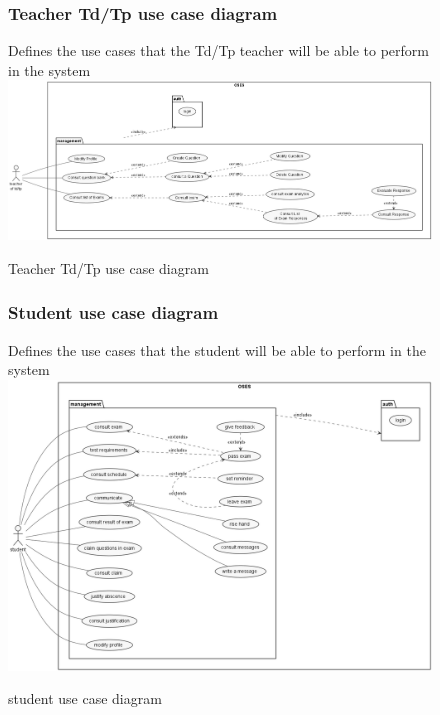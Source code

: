 \documentclass[]{uc2pfecaneva}
\begin{document}
    \begin{figure}
        \subsubsection{Teacher Td/Tp use case diagram}
        \raggedright{Defines the use cases that the Td/Tp teacher will be able to perform in the system}
        \includegraphics[width=\textwidth]{images/TP_TD_Teacher}
        \caption{Teacher Td/Tp use case diagram}
    \end{figure}

    \begin{figure}
        \subsubsection{Student use case diagram}
        \raggedright{Defines the use cases that the student will be able to perform in the system}
        \includegraphics[width=350pt]{images/student_UCD}
        \caption{student use case diagram}
    \end{figure}
\end{document}
